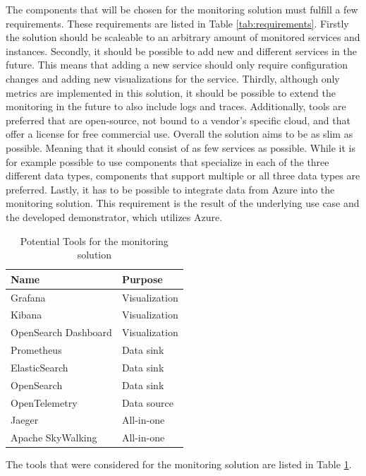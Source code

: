 The components that will be chosen for the monitoring solution must fulfill a few requirements.
These requirements are listed in Table \ref{tab:requirements}.
Firstly the solution should be scaleable to an arbitrary amount of monitored services and instances.
Secondly, it should be possible to add new and different services in the future.
This means that adding a new service should only require configuration changes and adding new visualizations for the service.
Thirdly, although only metrics are implemented in this solution, it should be possible to extend
the monitoring in the future to also include logs and traces.
Additionally, tools are preferred that are open-source, not bound to a vendor's specific cloud,
and that offer a license for free commercial use.
Overall the solution aims to be as slim as possible. Meaning that it should consist of as few services as possible.
While it is for example possible to use components that specialize in each of the three different data types,
components that support multiple or all three data types are preferred.
Lastly, it has to be possible to integrate data from Azure into the monitoring solution.
This requirement is the result of the underlying use case and the developed demonstrator,
which utilizes Azure.

\begin{table}[]
\begin{tabular}{l|l}
Name 					& Purpose 			\\
\hline
Grafana 				& Visualization		\\
Kibana 					& Visualization		\\
OpenSearch Dashboard 	& Visualization		\\
Prometheus 				& Data sink			\\
ElasticSearch 			& Data sink			\\
OpenSearch 				& Data sink			\\
OpenTelemetry 			& Data source		\\
Jaeger 					& All-in-one		\\
Apache SkyWalking 		& All-in-one
\end{tabular}
\caption{Potential Tools for the monitoring solution}
\label{tab:potential_tools}
\end{table}

The tools that were considered for the monitoring solution are listed in Table \ref{tab:potential_tools}.

